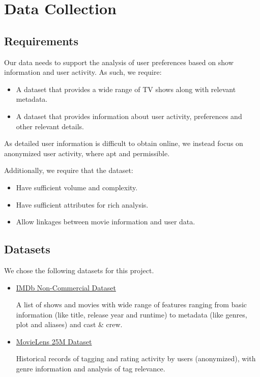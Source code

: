 \documentclass[10pt,titlepage]{article}
\begin{document}
\section{Data Collection}
\subsection{Requirements}
Our data needs to support the analysis of user preferences based on show information and user activity. As such, we
require:
\begin{itemize}
  \item A dataset that provides a wide range of TV shows along with relevant metadata.
  \item A dataset that provides information about user activity, preferences and other relevant details.
\end{itemize}

As detailed user information is difficult to obtain online, we instead focus on anonymized user activity,
where apt and permissible.

Additionally, we require that the dataset:
\begin{itemize}
  \item Have sufficient volume and complexity.
  \item Have sufficient attributes for rich analysis.
  \item Allow linkages between movie information and user data.
\end{itemize}

\subsection{Datasets}
We chose the following datasets for this project.
\begin{itemize}
    \item \href{https://developer.imdb.com/non-commercial-datasets/}{IMDb Non-Commercial Dataset}

        A list of shows and movies with wide range of features ranging from basic information (like title, release year
        and runtime) to metadata (like genres, plot and aliases) and cast \& crew.
    \item \href{https://grouplens.org/datasets/movielens/25m/}{MovieLens 25M Dataset}

        Historical records of tagging and rating activity by users (anonymized), with genre information and analysis of
        tag relevance.
\end{itemize}
\end{document}

